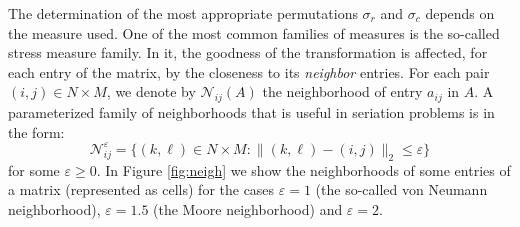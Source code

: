 \documentclass[a4paper,11pt, reqno]{amsart}
\begin{document}
The determination of the most appropriate permutations $\sigma_r$ and $\sigma_c$ depends on the measure used. One of the most common families of measures is the so-called stress measure family. In it, the goodness of the transformation is affected, for each entry of the matrix, by the closeness to its \emph{neighbor} entries. For each pair $(i,j) \in N\times M$, we denote by $\mathcal{N}_{ij}(A)$ the neighborhood of entry $a_{ij}$ in $A$. A parameterized family of neighborhoods that is useful in seriation problems is in the form:
$$
\mathcal{N}^\varepsilon_{ij}=\{(k,\ell ) \in N\times M: \|(k,\ell )-(i,j)\|_2\leq \varepsilon\}
$$
for some $\varepsilon \geq 0$.
In Figure \ref{fig:neigh} we show the neighborhoods of some entries of a matrix (represented as cells) for the cases $\varepsilon=1$ (the so-called von Neumann neighborhood), $\varepsilon=1.5$ (the Moore neighborhood) and $\varepsilon=2$.
\end{document}
